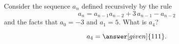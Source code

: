 \documentclass{ximera}
\author{Jim Talamo}
\begin{document}
\begin{exercise}

  Consider the sequence $a_{n}$ defined recursively by the
  rule
  \[
  a_n = {a_{n-1}} {a_{n-2}} + 3 \, {a_{n-1}} - {a_{n-2}}
  \]
  and the facts that $a_0 = -3$ and $a_1 = 5$.  What is $a_4$?
  
  
      \[
      a_4 = \answer[given]{111}.
      \]
  



\end{exercise}
\end{document}
